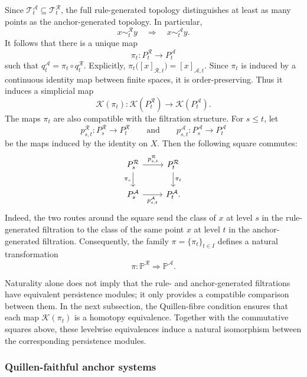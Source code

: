 \documentclass[a4paper,11pt]{article}
\theoremstyle{definition}
\theoremstyle{remark}
\begin{document}
Since $\mathcal T_t^{\mathcal A}\subseteq\mathcal T_t^{\mathcal R}$, the full rule-generated topology distinguishes at least as many points as the
anchor-generated topology. In particular,
$$
x\sim_t^{\mathcal R}y \quad\Longrightarrow\quad x\sim_t^{\mathcal A}y.
$$
It follows that there is a unique map
$$
\pi_t\colon P_t^{\mathcal R}\longrightarrow P_t^{\mathcal A}
$$
such that $q_t^{\mathcal A} = \pi_t\circ q_t^{\mathcal R}$. Explicitly, $\pi_t\bigl([x]_{\mathcal R,t}\bigr) = [x]_{\mathcal A,t}$. Since $\pi_t$ is induced by a continuous identity map between finite spaces, it is order-preserving. Thus it induces a simplicial map
$$
\mathcal K(\pi_t)\colon \mathcal K(P_t^{\mathcal R})\longrightarrow \mathcal K(P_t^{\mathcal A}).
$$
The maps $\pi_t$ are also compatible with the filtration structure. For $s\leq t$, let
$$
p_{s,t}^{\mathcal R}\colon P_s^{\mathcal R}\longrightarrow P_t^{\mathcal R}\qquad\text{and}\qquad p_{s,t}^{\mathcal A}\colon P_s^{\mathcal A}\longrightarrow P_t^{\mathcal A}
$$
be the maps induced by the identity on $X$. Then the following square commutes:
$$
\begin{tikzcd}
P_s^{\mathcal R} \arrow[r,"p_{s,t}^{\mathcal R}"] \arrow[d,"\pi_s"']
&
P_t^{\mathcal R} \arrow[d,"\pi_t"] \\
P_s^{\mathcal A} \arrow[r,"p_{s,t}^{\mathcal A}"']
&
P_t^{\mathcal A}.
\end{tikzcd}
$$
Indeed, the two routes around the square send the class of $x$ at level $s$ in the rule-generated filtration to the class of the same point $x$ at level $t$ in the anchor-generated filtration. Consequently, the family $\pi=\{\pi_t\}_{t\in I}$ defines a natural transformation
$$
\pi\colon \mathbb P^{\mathcal R}\Longrightarrow\mathbb P^{\mathcal A}.
$$

Naturality alone does not imply that the rule- and anchor-generated filtrations have equivalent persistence modules; it only provides a compatible comparison between them. In the next subsection, the Quillen-fibre condition ensures that each map $\mathcal K(\pi_t)$ is a homotopy equivalence. Together with the commutative squares above, these levelwise equivalences induce a natural isomorphism between the corresponding persistence modules.

\subsubsection*{Quillen-faithful anchor systems}
\end{document}

